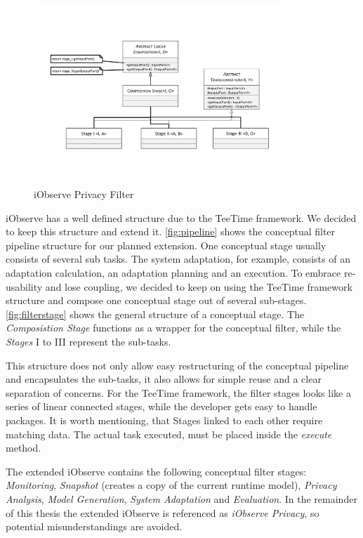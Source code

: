 \begin{figure}[h]
	\centering
	\includegraphics[trim = 20mm 40mm 20mm 35mm, clip, width=0.85\textwidth]{graphs/StageComposition}
	\caption{iObserve Privacy Filter}
	\label{fig:filterstage}
\end{figure}

iObserve has a well defined structure due to the TeeTime framework. We decided to keep this structure and extend it. \autoref{fig:pipeline} shows the conceptual filter pipeline structure for our planned extension. One conceptual stage usually consists of several sub tasks. The system adaptation, for example, consists of an adaptation calculation, an adaptation planning and an execution. To embrace re-usability and lose coupling, we decided to keep on using the TeeTime framework structure and compose one conceptual stage out of several sub-stages. \autoref{fig:filterstage} shows the general structure of a conceptual stage. The \textit{Composistion Stage} functions as a wrapper for the conceptual filter, while the \textit{Stages} I to III represent the sub-tasks.

This structure does not only allow easy restructuring of the conceptual pipeline and encapsulates the sub-tasks, it also allows for simple reuse and a clear separation of concerns. 
For the TeeTime framework, the filter stages looks like a series of linear connected stages, while the developer gets easy to handle packages. It is worth mentioning, that Stages linked to each other require matching data. The actual task executed, must be placed inside the \textit{execute} method.

The extended iObserve contains the following conceptual filter stages: \textit{Monitoring}, \textit{Snapshot} (creates a copy of the current runtime model), \textit{Privacy Analysis}, \textit{Model Generation}, \textit{System Adaptation} and \textit{Evaluation}. In the remainder of this thesis the extended iObserve is referenced as \textit{iObserve Privacy}, so potential misunderstandings are avoided.



